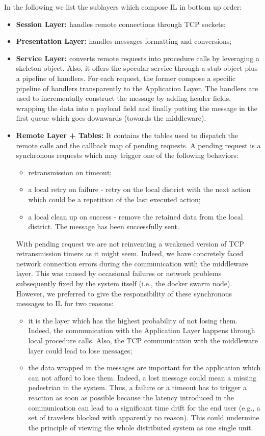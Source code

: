 In the following we list the sublayers which compose IL in
bottom up order:

\begin{itemize}
  \item \textbf{Session Layer:}
  handles remote connections through TCP sockets;
  \item \textbf{Presentation Layer:}
  handles messages formatting and conversions;
  \item \textbf{Service Layer:}
  converts remote requests into procedure calls
  by leveraging a skeleton object.
  Also, it offers the specular service through a stub object plus a pipeline
  of handlers. For each request, the former compose a specific pipeline
  of handlers transparently to the Application Layer.
  The handlers are used to incrementally construct the message by adding
  header fields, wrapping the data into a payload field and finally putting
  the message in the first queue which goes downwards (towards the middleware).
  \item \textbf{Remote Layer + Tables:}
  It contains the tables used
  to dispatch the remote calls and the callback map of pending requests.
  A pending request is a synchronous requests which may trigger one of
  the following behaviors:
  \begin{itemize}
  	\item retransmission on timeout;
  	\item a local retry on failure - retry on the local district with
  	the next action which could be a repetition of the last executed action;
  	\item a local clean up on success - remove the retained data from the local
  	district. The message has been successfully sent.
  \end{itemize}
  With pending request we are not reinventing a weakened version
  of TCP retransmission timers as it might seem.
  Indeed, we have concretely faced network connection errors during
  the communication
  with the middleware layer. This was caused by occasional failures or network
  problems subsequently fixed by the system itself
  (i.e., the docker swarm node).
  However,
  we preferred to give the responsibility of these synchronous messages to IL
  for two reasons:
  \begin{itemize}
  	\item it is the layer which has the highest probability of not losing them.
  	Indeed, the communication with the Application Layer happens through
  	local procedure
  	calls. Also, the TCP communication with the middleware layer could lead to
  	lose messages;
  	\item the data wrapped in the messages are important for the
  	application which can not afford to lose them. Indeed, a lost message
    could mean a missing pedestrian in the system. Thus, a failure
  	or a timeout has to trigger a reaction as soon as possible because
  	the latency introduced in the communication can lead to a significant
  	time drift for the end user (e.g., a set of travelers blocked with
  	apparently no reason). This could undermine the principle of viewing the
  	whole distributed system as one single unit.
  \end{itemize}
\end{itemize}